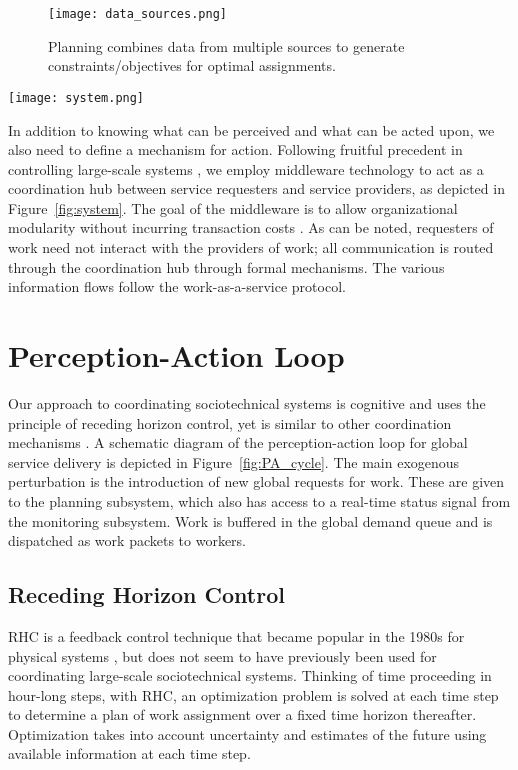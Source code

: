\documentclass[10pt,journal,cspaper,compsoc]{IEEEtran}
\begin{document}
\begin{figure}
  \centering
  \texttt{[image: data\_sources.png]}
  \caption{Planning combines data from multiple sources to generate constraints/objectives for optimal assignments.}
  \label{fig:data_sources}
\end{figure}

\begin{figure*}
  \centering
  \texttt{[image: system.png]}
  \caption{Global service delivery system design, with a coordination hub acting between requests and delivery centers.}
  \label{fig:system}
\end{figure*}

In addition to knowing what can be perceived and what can be acted upon, we also need to define a mechanism for
action.  Following fruitful precedent in controlling large-scale systems \cite{GrahamBK2009}, we employ middleware
technology to act as a coordination hub between service requesters and service providers, as depicted in Figure~\ref{fig:system}.
The goal of the middleware is to allow organizational modularity without incurring transaction costs 
\cite{BrusoniP2001,Foss2001,Baldwin2008}.  As can be noted, requesters of work need not interact with the
providers of work; all communication is routed through the coordination hub through formal mechanisms.  The
various information flows follow the work-as-a-service protocol.


\section{Perception-Action Loop}
\label{peractloop}
Our approach to coordinating sociotechnical systems is cognitive and uses the principle of receding horizon control, 
yet is similar to other coordination mechanisms \cite{MaloneC1994}.
A schematic diagram of the perception-action loop for global service delivery is depicted in Figure~\ref{fig:PA_cycle}.
The main exogenous perturbation is the introduction of new global requests for work.  These
are given to the planning subsystem, which also has access to a real-time status signal from the monitoring subsystem. 
Work is buffered in the global demand queue and is dispatched as work packets to workers.

\subsection{Receding Horizon Control}

RHC is a feedback control technique that became popular in the 1980s for physical systems \cite{MattingleyWB2011}, 
but does not seem to have previously been used for coordinating large-scale sociotechnical systems.  Thinking of time 
proceeding in hour-long steps, with RHC, an optimization problem is solved at each time step to determine a plan of 
work assignment over a fixed time horizon thereafter.  Optimization takes into account uncertainty and estimates of the future 
using available information at each time step. 
\end{document}
